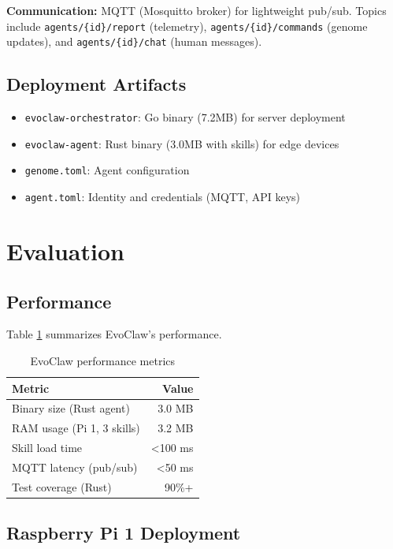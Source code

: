 \documentclass{article}
\begin{document}
\textbf{Communication:} MQTT (Mosquitto broker) for lightweight pub/sub. Topics include \texttt{agents/\{id\}/report} (telemetry), \texttt{agents/\{id\}/commands} (genome updates), and \texttt{agents/\{id\}/chat} (human messages).

\subsection{Deployment Artifacts}

\begin{itemize}
    \item \texttt{evoclaw-orchestrator}: Go binary (7.2MB) for server deployment
    \item \texttt{evoclaw-agent}: Rust binary (3.0MB with skills) for edge devices
    \item \texttt{genome.toml}: Agent configuration
    \item \texttt{agent.toml}: Identity and credentials (MQTT, API keys)
\end{itemize}

\section{Evaluation}\label{sec:evaluation}

\subsection{Performance}

Table \ref{tab:performance} summarizes EvoClaw's performance.

\begin{table}[h]
\centering
\begin{tabular}{lr}
\toprule
\textbf{Metric} & \textbf{Value} \\
\midrule
Binary size (Rust agent) & 3.0 MB \\
RAM usage (Pi 1, 3 skills) & 3.2 MB \\
Skill load time & <100 ms \\
MQTT latency (pub/sub) & <50 ms \\
Test coverage (Rust) & 90\%+ \\
\bottomrule
\end{tabular}
\caption{EvoClaw performance metrics}
\label{tab:performance}
\end{table}

\subsection{Raspberry Pi 1 Deployment}
\end{document}
